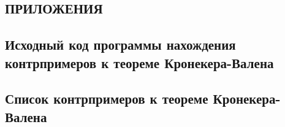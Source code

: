 \documentclass[_00_dissertation.tex]{subfiles}
\begin{document}
\onlyinsubfile{
    \renewcommand{\contentsname}{ОГЛАВЛЕНИЕ}
    \setcounter{tocdepth}{3}
    \tableofcontents
}

\begin{center}
    \chapter*{ПРИЛОЖЕНИЯ}\label{section:Appendix_code}
\end{center}

\section*{Исходный код программы нахождения контрпримеров к теореме Кронекера-Валена}\label{section:Appendix_code}



\section*{Список контрпримеров к теореме Кронекера-Валена}\label{section:Appendix_counterexample}
\end{document}
